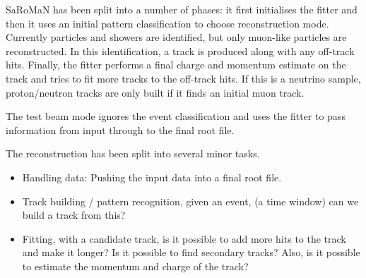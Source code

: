 SaRoMaN has been split into a number of phases: it first initialises the fitter and then it uses an initial pattern classification to choose reconstruction mode. Currently particles and showers are identified, but only muon-like particles are reconstructed. In this identification, a track is produced along with any off-track hits. Finally, the fitter performs a final charge and momentum estimate on the track and tries to fit more tracks to the off-track hits. If this is a neutrino sample, proton/neutron tracks are only built if it finds an initial muon track.

The test beam mode ignores the event classification and uses the fitter to pass information from input through to the final root file.

The reconstruction has been split into several minor tasks.
\begin{itemize}
\item Handling data: Pushing the input data into a final root file.
\item Track building / pattern recognition, given an event, (a time window) can we build a track from this?
\item Fitting, with a candidate track, is it possible to add more hits to the track and make it longer? Is it possible to find secondary tracks? Also, is it possible to estimate the momentum and charge of the track?
\end{itemize}


